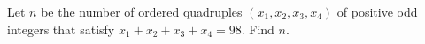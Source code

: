 Let $n$ be the number of ordered quadruples $(x_1,x_2,x_3,x_4)$ of positive odd integers that satisfy $x_1+x_2+x_3+x_4=98$. Find $n$.
